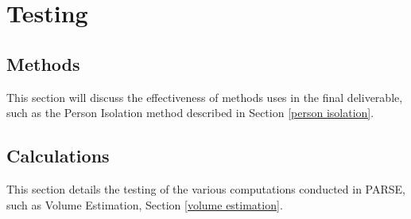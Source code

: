 \chapter{Testing}
\label{testing}
\section{Methods}
\label{methods}
This section will discuss the effectiveness of methods uses in the final deliverable, such as the Person Isolation method described in Section \ref{person isolation}.

\section{Calculations}
\label{calculations}
This section details the testing of the various computations conducted in PARSE, such as Volume Estimation, Section \ref{volume estimation}.

